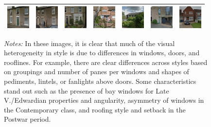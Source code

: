 \documentclass[]{article}
\begin{document}
\begin{figure}[htb!]
\begin{tabular}{lllllll}
  \includegraphics[width=45px]{images//0001000010059967_e8c8bmHUpyKpiIZ1YO9ypg.jpg} & \includegraphics[width=45px]{images//0001000010103388_CZH157SXYmF3dEVMKlWBfQ.jpg} & \includegraphics[width=45px]{images//0001000010025644_bJ8zv37pDsP0CImvDMKC0w.jpg} & \includegraphics[width=45px]{images//0001000010144910_COpJNwPw67J78VXCoN_HMA.jpg} & \includegraphics[width=45px]{images//0001000009992797_JUTa4GsWaXplyCP6XeVAvw.jpg} & \includegraphics[width=45px]{images//1000002500086356_n92s3snPX2zAwEiJnA-Pxg.jpg} & \includegraphics[width=45px]{images//0001000010176201_dDyXoyEbeMXUhCagwazbiA.jpg} \\ 
   \hline
\end{tabular}
\label{fig:vint_examples}
\begin{minipage}{0.75\textwidth}
\footnotesize \emph{Notes:} In these images, it is clear that much of the visual heterogeneity in style is due to differences in windows, doors, and rooflines. For example, there are clear differences across styles based on groupings and number of panes per windows and shapes of pediments, lintels, or fanlights above doors. Some characteristics stand out such as the presence of bay windows for Late V./Edwardian properties and angularity, asymmetry of windows in the Contemporary class, and roofing style and setback in the Postwar period.
\end{minipage}
\end{figure}
\end{document}
